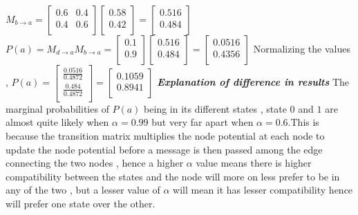 \documentclass[a4paper,12pt]{article}
\begin{document}
 \newline  $M_{b \rightarrow a}=\left[ {\begin{array}{cc}
   0.6 & 0.4 \\
   0.4 & 0.6 \\
  \end{array} } \right] \left[ {\begin{array}{c}
   0.58\\
   0.42\\
  \end{array} } \right]= \left[ {\begin{array}{c}
   0.516\\
   0.484\\
  \end{array} } \right]$
  \newline $P(a)=M_{d \rightarrow a}M_{b \rightarrow a}=\left[ {\begin{array}{c}
   0.1\\
   0.9\\
  \end{array} } \right]\left[ {\begin{array}{c}
   0.516\\
   0.484\\
  \end{array} } \right]=\left[ {\begin{array}{c}
   0.0516\\
   0.4356\\
  \end{array} } \right]$
   \newline Normalizing the values , $P(a)=\left[ {\begin{array}{c}
   \frac{0.0516}{0.4872}\\
  \frac{0.484}{0.4872}\\
  \end{array} } \right]=\left[ {\begin{array}{c}
  0.1059\\
  0.8941\\
  \end{array} } \right]$
  \newline \emph{\textbf{Explanation of difference in results}}
  \newline The marginal probabilities of $P(a)$ being in its different states , state $0$ and $1$ are almost quite likely when $\alpha=0.99$ but very far apart when $\alpha=0.6$.This is because the transition matrix multiplies the node potential at each node to update the node potential before a message is then passed among the edge connecting the two nodes , hence a higher $\alpha$ value means there is higher compatibility between the states and the node will more on less prefer to be in any of the two , but a lesser value of $\alpha$ will mean it has lesser compatibility hence will prefer one state over the other.
\end{document}
